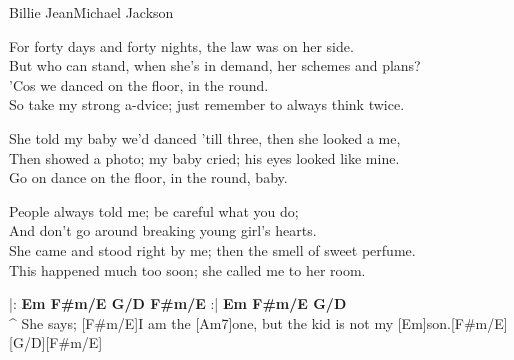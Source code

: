 \begin{song}{Billie Jean}{Michael Jackson}
\begin{guitar}
For forty days and forty nights, the law was on her side.\\
But who can stand, when she's in demand, her schemes and plans?\\
'Cos we danced on the floor, in the round.\\
So take my strong a-dvice; just remember to always think twice.\\
\end{guitar}

\begin{guitar}
She told my baby we'd danced 'till three, then she looked a me,\\
Then showed a photo; my baby cried; his eyes looked like mine.\\
Go on dance on the floor, in the round, baby.\\
\end{guitar}

\begin{guitar}
People always told me; be careful what you do;\\
And don't go around breaking young girl's hearts.\\
She came and stood right by me; then the smell of sweet perfume.\\
This happened much too soon; she called me to her room.\\
\end{guitar}


\begin{guitar}
|: \textbf{ Em  F#m/E G/D  F#m/E} :| \textbf{Em  F#m/E G/D}\\
^ She says; [F#m/E]I am the [Am7]one, but the kid is not my [Em]son.[F#m/E][G/D][F#m/E]\\
\end{guitar}

\end{song}
